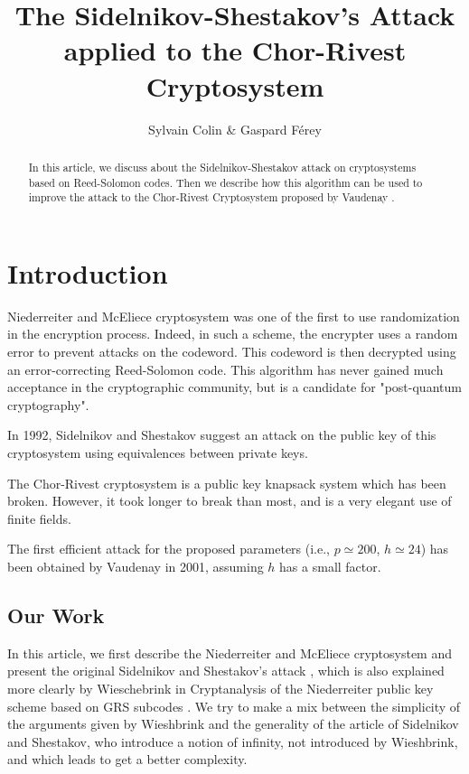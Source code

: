 \documentclass[a4paper]{article}
\author{Sylvain Colin \& Gaspard Férey}
\title{The Sidelnikov-Shestakov's Attack applied to the Chor-Rivest Cryptosystem}
\begin{document}
\maketitle

\begin{abstract}

In this article, we discuss about the Sidelnikov-Shestakov attack on cryptosystems based on Reed-Solomon codes. Then we describe how this algorithm can be used to improve the attack to the Chor-Rivest Cryptosystem proposed by Vaudenay \cite{Vau01}.

\end{abstract}

\section{Introduction}
\label{sec:intro}

Niederreiter and McEliece cryptosystem \cite{NiederH86} was one of the first to use randomization in the encryption process. Indeed, in such a scheme, the encrypter uses a random error to prevent attacks on the codeword. This codeword is then decrypted using an error-correcting Reed-Solomon code. This algorithm has never gained much acceptance in the cryptographic community, but is a candidate for "post-quantum cryptography".

In 1992, Sidelnikov and Shestakov suggest an attack \cite{SidelShes92} on the public key of this cryptosystem using equivalences between private keys.

The Chor-Rivest cryptosystem \cite{ChorRiv88} is a public key knapsack system which has been broken.  However, it took longer to break than most, and is a very elegant use of finite fields.

The first efficient attack for the proposed parameters (i.e., $p \simeq 200$, $h \simeq 24$) has been obtained by Vaudenay in 2001, assuming $h$ has a small factor.


\subsection{Our Work}
In this article, we first describe the Niederreiter and McEliece cryptosystem and present the original Sidelnikov and Shestakov's attack \cite{SidelShes92}, which is also explained more clearly by Wieschebrink in Cryptanalysis of the Niederreiter public key scheme based on GRS subcodes \cite{Wiesch}.
We try to make a mix between the simplicity of the arguments given by Wieshbrink and the generality of the article of Sidelnikov and Shestakov, who introduce a notion of infinity,
not introduced by Wieshbrink, and which leads to get a better complexity.
\end{document}
